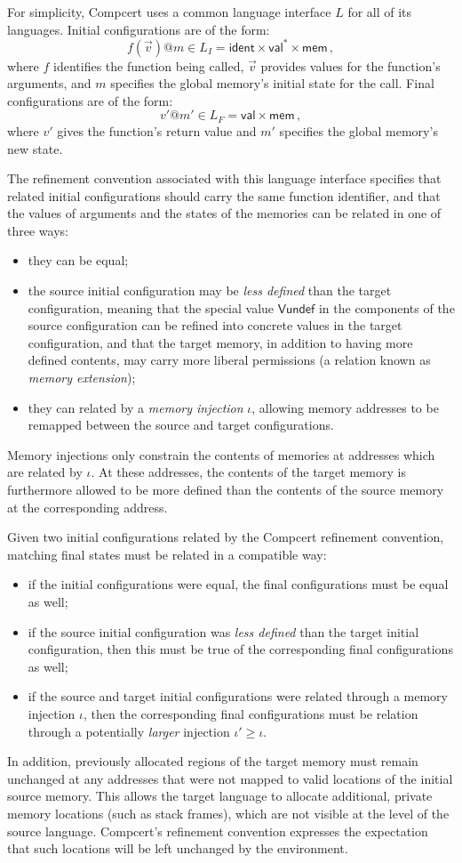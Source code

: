 \documentclass[sigplan,10pt,review,anonymous]{acmart}
\newcommand{\kw}[1]{\ensuremath{ \textsf{#1} }}
\begin{document}
For simplicity,
Compcert uses a common language interface $L$
for all of its languages.
Initial configurations are of the form:
\[ f(\vec{v})@m \in L_I = \kw{ident} \times \kw{val}^* \times \kw{mem} \,, \]
where $f$ identifies the function being called,
$\vec{v}$ provides values for the function's arguments, and
$m$ specifies the global memory's initial state for the call.
Final configurations are of the form:
\[ v'@m' \in L_F = \kw{val} \times \kw{mem} \,, \]
where $v'$ gives the function's return value and
$m'$ specifies the global memory's new state.

The refinement convention associated with this language interface
specifies that
related initial configurations should carry the same function identifier,
and that the values of arguments and the states of the memories
can be related in one of three ways:
\begin{itemize}
\item they can be equal;
\item the source initial configuration may be
  \emph{less defined} than the target configuration,
  meaning that the special value $\kw{Vundef}$
  in the components of the source configuration
  can be refined into concrete values in the target configuration,
  and that the target memory,
  in addition to having more defined contents,
  may carry more liberal permissions
  (a relation known as \emph{memory extension});
\item they can related by a \emph{memory injection} $\iota$,
  allowing memory addresses to be remapped
  between the source and target configurations.
\end{itemize}
Memory injections only constrain the contents of memories
at addresses which are related by $\iota$.
At these addresses,
the contents of the target memory is furthermore
allowed to be more defined than the contents of the source
memory at the corresponding address.

Given two initial configurations related by
the Compcert refinement convention,
matching final states
must be related in a compatible way:
\begin{itemize}
\item if the initial configurations were equal,
  the final configurations must be equal as well;
\item if the source initial configuration was
  \emph{less defined} than the target initial configuration,
  then this must be true of the corresponding
  final configurations as well;
\item if the source and target initial configurations
  were related through a memory injection $\iota$,
  then the corresponding final configurations
  must be relation through a potentially \emph{larger}
  injection $\iota' \ge \iota$.
\end{itemize}
In addition,
previously allocated regions of the target memory
must remain unchanged
at any addresses that were not mapped to valid locations
of the initial source memory.
This allows the target language to allocate additional,
private memory locations (such as stack frames),
which are not visible at the level of the source language.
Compcert's refinement convention
expresses the expectation that such locations
will be left unchanged by the environment.
\end{document}
